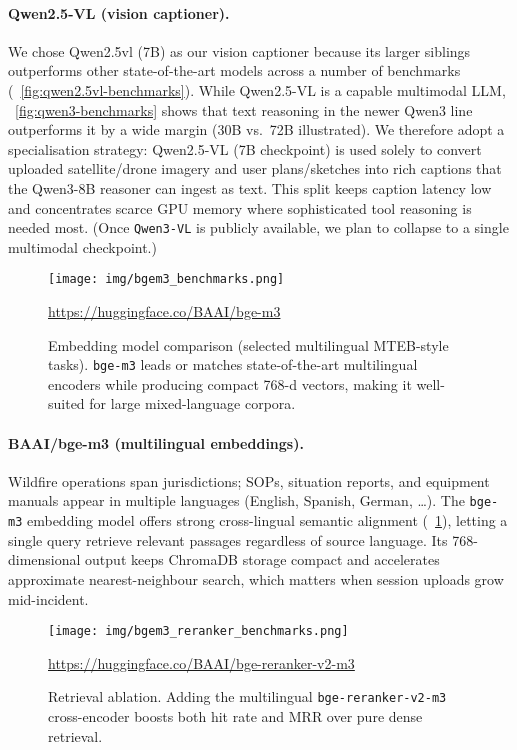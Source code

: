 \documentclass[lang=english,inputenc=utf8,fontsize=10pt]{ldvarticle}
\begin{document}
\paragraph{Qwen2.5-VL (vision captioner).}
We chose Qwen2.5vl (7B) as our vision captioner because its larger 
siblings outperforms other state-of-the-art models across a number of benchmarks
(~\cref{fig:qwen2.5vl-benchmarks}). While Qwen2.5-VL is a capable multimodal LLM, 
~\cref{fig:qwen3-benchmarks} shows that text reasoning in the newer Qwen3 line outperforms it by a wide
margin (30B vs.\ 72B illustrated). We therefore adopt a
specialisation strategy: Qwen2.5-VL (7B checkpoint) is used solely
to convert uploaded satellite/drone imagery and user plans/sketches into rich
captions that the Qwen3-8B reasoner can ingest as text. This split keeps
caption latency low and concentrates scarce GPU memory where sophisticated
tool reasoning is needed most. (Once \texttt{Qwen3-VL} is publicly
available, we plan to collapse to a single multimodal checkpoint.)

\begin{figure}[t]
  \centering
  \texttt{[image: img/bgem3\_benchmarks.png]}
  \caption{Embedding model comparison (selected multilingual MTEB-style
           tasks).  \texttt{bge-m3} leads or matches state-of-the-art
           multilingual encoders while producing compact 768-d vectors,
           making it well-suited for large mixed-language corpora.}
  \label{fig:bgem3-benchmarks}
  \url{https://huggingface.co/BAAI/bge-m3}
\end{figure}

\paragraph{BAAI/bge-m3 (multilingual embeddings).}
Wildfire operations span jurisdictions; SOPs, situation reports, and
equipment manuals appear in multiple languages (English, Spanish, German,
\ldots). The \texttt{bge-m3} embedding model offers strong
cross-lingual semantic alignment (~\cref{fig:bgem3-benchmarks}),
letting a single query retrieve relevant passages regardless of source
language. Its 768-dimensional output keeps ChromaDB storage compact and
accelerates approximate nearest-neighbour search, which matters when
session uploads grow mid-incident.

\begin{figure}[t]
  \centering
  \texttt{[image: img/bgem3\_reranker\_benchmarks.png]}
  \caption{Retrieval ablation.  Adding the multilingual
           \texttt{bge-reranker-v2-m3} cross-encoder boosts both
           hit rate and MRR over pure dense retrieval.}
  \label{fig:bgem3-reranker}
  \url{https://huggingface.co/BAAI/bge-reranker-v2-m3}
\end{figure}
\end{document}
